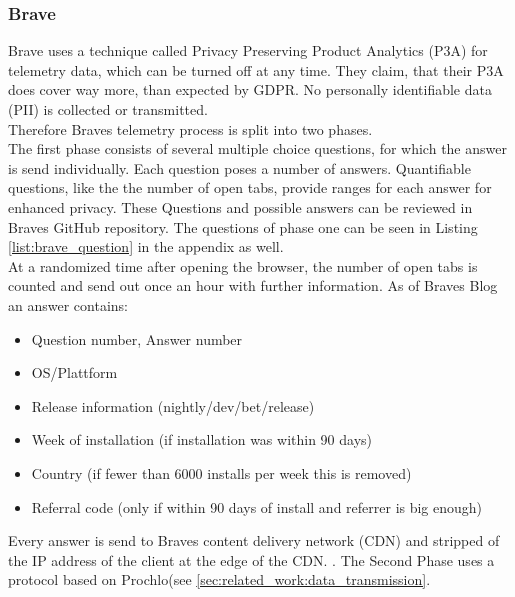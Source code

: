 \subsubsection{Brave}
    Brave uses a technique called Privacy Preserving Product Analytics (P3A) for telemetry data, which can be turned off at any time.
    They claim, that their P3A does cover way more, than expected by GDPR. No personally identifiable data (PII) is collected or transmitted.\\
    Therefore Braves telemetry process is split into two phases.\\
    The first phase consists of several multiple choice questions, for which the answer is send individually.
    Each question poses a number of answers. Quantifiable questions, like the the number of open tabs, provide ranges for each answer for enhanced privacy\cite{brave_privacy-preserving_2019}. These Questions and possible answers can be reviewed in Braves GitHub repository\cite{brave_software_inc_brave-browser_2019}.
    The questions of phase one can be seen in Listing \ref{list:brave_question} in the appendix as well.\\
    At a randomized time after opening the browser, the number of open tabs is counted and send out once an hour with further information\cite{brave_privacy-preserving_2019}.
    As of Braves Blog\cite{brave_privacy-preserving_2019} an answer contains:
    \begin{itemize}
        \item Question number, Answer number
        \item OS/Plattform
        \item Release information (nightly/dev/bet/release)
        \item Week of installation (if installation was within 90 days)
        \item Country (if fewer than 6000 installs per week this is removed)
        \item Referral code (only if within 90 days of install and referrer is big enough)
    \end{itemize}
    Every answer is send to Braves content delivery network (CDN) and stripped of the IP address of the client at the edge of the CDN.
    . 
    The Second Phase uses a protocol based on Prochlo(see \ref{sec:related_work:data_transmission}. 
    
    
    

